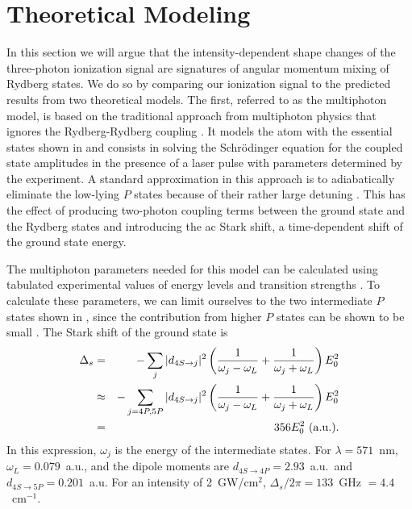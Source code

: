 \section{Theoretical Modeling}
\hspace{\parindent}  In this section we will argue that the
intensity-dependent shape changes of the three-photon ionization signal are
signatures of angular momentum mixing of Rydberg states.  We do so by comparing
our ionization signal to the predicted results from two theoretical models.  The
first, referred to as the multiphoton model, is
based on the traditional approach from multiphoton physics that ignores the
Rydberg-Rydberg coupling
\cite{Fedorov:89a,Gratl:89,Yeazell:90,Raczynski:93,MIvanov:94,Wojcik:95}.  It 
models the atom with the essential states shown in
 and consists in solving the Schr\"{o}dinger equation for the
coupled state amplitudes in the presence of a laser pulse with parameters
determined by the experiment.  A standard approximation in this approach is to
adiabatically eliminate the low-lying $P$ states because of their rather large
detuning \cite{Allen:87}.  This has the effect of producing two-photon coupling
terms between the ground state and the Rydberg states and introducing the ac
Stark shift, a time-dependent shift of the ground state energy.

The multiphoton parameters needed for this model can be calculated using
tabulated experimental values of energy levels \cite{Moore:71} and transition
strengths \cite{Wiese:69}.  To calculate these parameters, we can limit
ourselves to the two intermediate $P$ states shown in , since the
contribution from higher $P$ states can be shown to be small \cite{Allen:82}. 
The Stark shift of the ground state is
\begin{eqnarray}
\Delta_s & = & - \sum_{j}|d_{4S \rightarrow j}|^2
\left(\frac{1}{\omega_{j}-\omega_L} + \frac{1}{\omega_{j}+ \omega_L}\right)
E_0^2  \label{stark_shift} \\ & \approx & - \sum_{j=4P,5P}|d_{4S
\rightarrow j}|^2
\left(\frac{1}{\omega_{j}-\omega_L} + \frac{1}{\omega_{j}+ \omega_L}\right)
E_0^2 \\ & = & 356 E_0^2 \ {\rm (a.u.)}.
\end{eqnarray}
In this expression, $\omega_{j}$ is the energy of the intermediate states.  For
$\lambda = 571$~nm, $\omega_L = 0.079$~a.u., and the dipole moments are
$d_{4S \rightarrow 4P} = 2.93$~a.u.\ and $d_{4S \rightarrow 5P} = 0.201$~a.u. 
For an intensity of 2~GW/cm$^2$, $\Delta_s/2\pi = 133$~GHz $= 4.4$~cm$^{-1}$.

